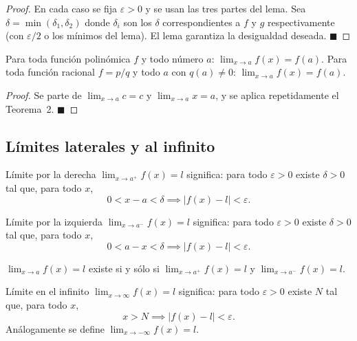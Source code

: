 \documentclass[12pt]{article}
\begin{document}
\begin{proof}
En cada caso se fija $\varepsilon > 0$ y se usan las tres partes del lema. Sea $\delta = \min(\delta_1, \delta_2)$ donde $\delta_i$ son los $\delta$ correspondientes a $f$ y $g$ respectivamente (con $\varepsilon/2$ o los mínimos del lema). El lema garantiza la desigualdad deseada.
$\blacksquare$
\end{proof}

\begin{corolario}[]{}
Para toda función polinómica $f$ y todo número $a$: $\displaystyle\lim_{x \to a} f(x) = f(a)$.
Para toda función racional $f = p/q$ y todo $a$ con $q(a) \neq 0$: $\displaystyle\lim_{x \to a} f(x) = f(a)$.
\end{corolario}

\begin{proof}
Se parte de $\lim_{x \to a} c = c$ y $\lim_{x \to a} x = a$, y se aplica repetidamente el Teorema~2.
$\blacksquare$
\end{proof}

\subsection{Límites laterales y al infinito}

\begin{definicion}[]{Límite por la derecha}
$\displaystyle\lim_{x \to a^+} f(x) = l$ significa: para todo $\varepsilon > 0$ existe $\delta > 0$ tal que, para todo $x$,
\[ 0 < x - a < \delta \implies |f(x) - l| < \varepsilon. \]
\end{definicion}

\begin{definicion}[]{Límite por la izquierda}
$\displaystyle\lim_{x \to a^-} f(x) = l$ significa: para todo $\varepsilon > 0$ existe $\delta > 0$ tal que, para todo $x$,
\[ 0 < a - x < \delta \implies |f(x) - l| < \varepsilon. \]
\end{definicion}

\begin{proposicion}[]{}
$\displaystyle\lim_{x \to a} f(x) = l$ existe si y sólo si $\displaystyle\lim_{x \to a^+} f(x) = l$ y $\displaystyle\lim_{x \to a^-} f(x) = l$.
\end{proposicion}

\begin{definicion}[]{Límite en el infinito}
$\displaystyle\lim_{x \to \infty} f(x) = l$ significa: para todo $\varepsilon > 0$ existe $N$ tal que, para todo $x$,
\[ x > N \implies |f(x) - l| < \varepsilon. \]
Análogamente se define $\displaystyle\lim_{x \to -\infty} f(x) = l$.
\end{definicion}
\end{document}

